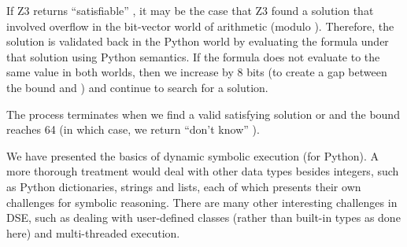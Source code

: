 ﻿\documentclass{IOS-Book-Article}
\begin{document}
\begin{mdP}[class={indent},data-line={871}]%
{}If Z3 returns
{}{\textquotedblleft}satisfiable{\textquotedblright}%
{}, it may be the case that Z3 found a solution
that involved overflow in the bit-vector world of arithmetic
(modulo %
{}%
{}). Therefore,
the solution is validated back in the
Python world by evaluating the formula under that solution
using Python semantics. 
If the formula does not evaluate to the same
value in both worlds, then we increase %
{}%
{} by 8 bits (to 
create a gap between the bound and %
{}%
{}) and continue to search
for a solution.%
\end{mdP}%
\begin{mdP}[class={indent},data-line={883}]%
{}The process terminates when we find a valid satisfying solution 
or %
{}%
{} and the bound reaches 64 (in which case, we return %
{}{\textquotedblleft}don{'}t know{\textquotedblright}%
{}).%
\end{mdP}%
\begin{mdP}[data-line={888}]%
{}We have presented the basics of dynamic symbolic execution 
(for Python).
A more thorough treatment would deal with other data types besides
integers, such as Python dictionaries, strings and lists, each
of which presents their own challenges for symbolic reasoning. 
There are many other interesting challenges in DSE, such
as dealing with user-defined classes (rather than built-in types
as done here) and multi-threaded execution.%
\end{mdP}%
\end{document}

